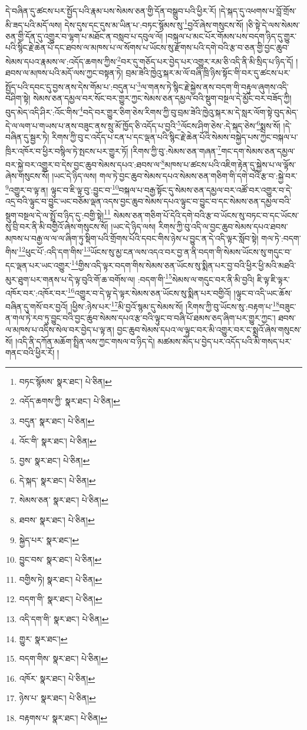 དེ་བཞིན་དུ་ཚངས་པར་སྤྱོད་པའི་རྣམ་པས་སེམས་ཅན་གྱི་དོན་བསྒྲུབ་པའི་ཕྱིར་རོ། །དེ་སྐད་དུ་འཕགས་པ་བློ་གྲོས་མི་ཟད་པའི་མདོ་ལས། དེས་དུས་དང་དུས་མ་ཡིན་པ་:བཏང་སྙོམས་སུ་\footnote{བཏང་སྙོམས་  སྣར་ཐང་།  པེ་ཅིན། }བྱའོ་ཞེས་གསུངས་སོ། །ཅི་སྟེ་དེ་ལས་སེམས་ཅན་གྱི་དོན་དུ་འགྱུར་བ་ལྷག་པ་མཐོང་ན་བསླབ་པ་དབུལ་ལོ། །བསྐལ་པ་མང་པོར་གོམས་པས་བདག་ཉིད་དུ་གྱུར་པའི་སྙིང་རྗེ་ཆེན་པོ་དང་ཐབས་ལ་མཁས་པ་ལ་སོགས་པ་ཡོངས་སུ་རྫོགས་པའི་དགེ་བའི་རྩ་བ་ཅན་གྱི་བྱང་ཆུབ་སེམས་དཔའ་རྣམས་ལ་:འདོད་ཆགས་ཀྱིས་\footnote{འདོད་ཆགས་ཀྱི་  སྣར་ཐང་།  པེ་ཅིན། }བར་དུ་གཅོད་པར་བྱེད་པར་འགྱུར་རམ་ཅི་འདི་ནི་མི་སྲིད་པ་ཉིད་དོ། །ཐབས་ལ་མཁས་པའི་མདོ་ལས་ཀྱང་བསྟན་ཏེ། བྲམ་ཟེའི་ཁྱེའུ་སྐར་མ་ལོ་བཞི་ཁྲི་ཉིས་སྟོང་གི་བར་དུ་ཚངས་པར་སྤྱོད་པའི་དབང་དུ་བྱས་ནས་དེས་གོམ་པ་:བདུན་པ་\footnote{བདུན་  སྣར་ཐང་།  པེ་ཅིན། }ལ་གནས་ཏེ་སྙིང་རྗེ་སྐྱེས་ནས་བདག་གི་བརྟུལ་ཞུགས་འདི་བཤིག་སྟེ། སེམས་ཅན་དམྱལ་བར་སོང་བར་གྱུར་ཀྱང་སེམས་ཅན་དམྱལ་བའི་སྡུག་བསྔལ་དེ་མྱོང་བར་བཟོད་ཀྱི། བུད་མེད་འདི་ཤིར་:འོང་གིས་\footnote{འོང་གི་  སྣར་ཐང་།  པེ་ཅིན། }བདེ་བར་གྱུར་ཅིག་ཅེས་རིགས་ཀྱི་བུ་བྲམ་ཟེའི་ཁྱེའུ་སྐར་མ་དེ་སླར་ལོག་སྟེ་བུད་མེད་དེ་ལ་ལག་པ་གཡས་པ་ནས་བཟུང་ནས་སྲུ་མོ་ཁྱོད་ཅི་འདོད་པ་བྱའི་\footnote{བྱས་  སྣར་ཐང་།  པེ་ཅིན། }ལོངས་ཤིག་ཅེས་:དེ་སྐད་ཅེས་\footnote{དེ་སྐད་  སྣར་ཐང་།  པེ་ཅིན། }སྨྲས་སོ། །དེ་བཞིན་དུ་སྦྱར་ཏེ། རིགས་ཀྱི་བུ་ང་འདོད་པ་ངན་པ་དང་ལྡན་པའི་སྙིང་རྗེ་ཆེན་པོའི་སེམས་བསྐྱེད་པས་ཀྱང་བསྐལ་པ་ཁྲིར་འཁོར་བ་ཕྱིར་བསྙིལ་ཏེ་སྤངས་པར་གྱུར་ཏོ། །རིགས་ཀྱི་བུ་:སེམས་ཅན་གཞན་\footnote{སེམས་ཅན་  སྣར་ཐང་།  པེ་ཅིན། }གང་དག་སེམས་ཅན་དམྱལ་བར་སྐྱེ་བར་འགྱུར་བ་དེས་བྱང་ཆུབ་སེམས་དཔའ་:ཐབས་ལ་\footnote{ཐབས་  སྣར་ཐང་།  པེ་ཅིན། }མཁས་པ་ཚངས་པའི་འཇིག་རྟེན་དུ་སྐྱེས་པ་ལ་ལྟོས་ཞེས་གསུངས་སོ། །ཡང་དེ་ཉིད་ལས། གལ་ཏེ་བྱང་ཆུབ་སེམས་དཔའ་སེམས་ཅན་གཅིག་གི་དགེ་བའི་རྩ་བ་:སྐྱེ་བར་\footnote{སྐྱེད་པར་  སྣར་ཐང་། }འགྱུར་བ་ལྟ་ན། ལྟུང་བ་ཇི་ལྟ་བུ་:བྱུང་བ་\footnote{བྱུང་བས་  སྣར་ཐང་།  པེ་ཅིན། }བསྐལ་པ་བརྒྱ་སྟོང་དུ་སེམས་ཅན་དམྱལ་བར་འཚོ་བར་འགྱུར་བ་དེ་འདྲ་བའི་ལྟུང་བ་བྱུང་ཡང་བཅོམ་ལྡན་འདས་བྱང་ཆུབ་སེམས་དཔའ་ལྟུང་བ་བྱུང་བ་དང་སེམས་ཅན་དམྱལ་བའི་སྡུག་བསྔལ་དེ་ལ་སྤྲོ་བ་ཉིད་དུ་:བགྱི་སྟེ།\footnote{བགྱིས་ཏེ།  སྣར་ཐང་།  པེ་ཅིན། } སེམས་ཅན་གཅིག་པོ་དེའི་དགེ་བའི་རྩ་བ་ཡོངས་སུ་བཏང་བ་དང་ཡོངས་སུ་བྲི་བར་ནི་མི་བགྱིའོ་ཞེས་གསུངས་སོ། །ཡང་དེ་ཉིད་ལས། རིགས་ཀྱི་བུ་འདི་ལ་བྱང་ཆུབ་སེམས་དཔའ་ཐབས་མཁས་པ་བརྒྱ་ལ་ལ་ལ་ཞིག་ཏུ་སྡིག་པའི་གྲོགས་པོའི་དབང་གིས་ཉེས་པ་བྱུང་ན་དེ་འདི་ལྟར་སློབ་སྟེ། གལ་ཏེ་:བདག་གིས་\footnote{བདག་གི་  སྣར་ཐང་།  པེ་ཅིན། }ཕུང་པོ་:འདི་དག་གིས་\footnote{འདི་དག་གི་  སྣར་ཐང་།  པེ་ཅིན། }ཡོངས་སུ་མྱ་ངན་ལས་འདའ་བར་བྱ་ན་ནི་བདག་གི་སེམས་ཡོངས་སུ་གདུང་བ་དང་ལྡན་པར་ཡང་འགྱུར་\footnote{གྱུར་  སྣར་ཐང་། }གྱིས་འདི་ལྟར་བདག་གིས་སེམས་ཅན་ཡོངས་སུ་སྨིན་པར་བྱ་བའི་ཕྱིར་ཕྱི་མའི་མཐའི་མུར་ཐུག་པར་གནས་པ་དེ་ལྟ་བུའི་གོ་ཆ་བགོས་ལ། :བདག་གི་\footnote{བདག་གིས་  སྣར་ཐང་།  པེ་ཅིན། }སེམས་ལ་གདུང་བར་ནི་མི་བྱའི། ཇི་ལྟ་ཇི་ལྟར་འཁོར་བར་:འཁོར་བར་\footnote{འཁོར་  སྣར་ཐང་།  པེ་ཅིན། }འགྱུར་བ་དེ་ལྟ་དེ་ལྟར་སེམས་ཅན་ཡོངས་སུ་སྨིན་པར་བགྱིའོ། །ལྟུང་བ་འདི་ཡང་ཆོས་བཞིན་དུ་གསོ་བར་བྱའོ། །ཕྱིས་:ཉེས་པར་\footnote{ཉེས་པ་  སྣར་ཐང་།  པེ་ཅིན། }མི་བྱའོ་སྙམ་དུ་སེམས་སོ། །རིགས་ཀྱི་བུ་ཡོངས་སུ་:བརྟག་པ་\footnote{བརྟགས་པ་  སྣར་ཐང་།  པེ་ཅིན། }བཟུང་ན་གལ་ཏེ་རབ་ཏུ་བྱུང་བའི་བྱང་ཆུབ་སེམས་དཔའ་རྩ་བའི་ལྟུང་བ་བཞི་པོ་ཐམས་ཅད་ཞིག་པར་གྱུར་ཀྱང་། ཐབས་ལ་མཁས་པ་འདིས་སེལ་བར་བྱེད་པ་ལྟ་ན། བྱང་ཆུབ་སེམས་དཔའ་ལ་ལྟུང་བར་མི་འགྱུར་བར་ང་སྨྲའོ་ཞེས་གསུངས་སོ། །འདི་ནི་དཀོན་མཆོག་སྤྲིན་ལས་ཀྱང་གསལ་བ་ཉིད་དེ། མཚམས་མེད་པ་བྱེད་པར་འདོད་པའི་མི་གསད་པར་གནང་བའི་ཕྱིར་རོ། །

